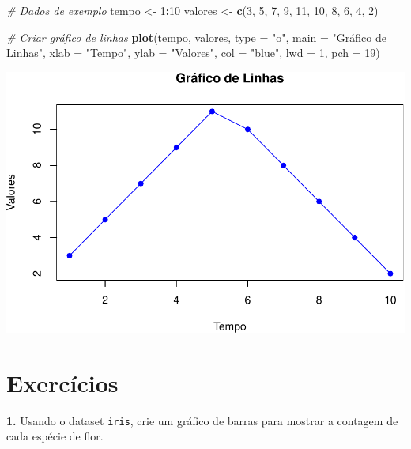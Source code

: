 \documentclass[
]{book}
\newenvironment{Shaded}{\begin{snugshade}}{\end{snugshade}}
\newcommand{\AttributeTok}[1]{\textcolor[rgb]{0.13,0.29,0.53}{#1}}
\newcommand{\CommentTok}[1]{\textcolor[rgb]{0.56,0.35,0.01}{\textit{#1}}}
\newcommand{\DecValTok}[1]{\textcolor[rgb]{0.00,0.00,0.81}{#1}}
\newcommand{\FunctionTok}[1]{\textcolor[rgb]{0.13,0.29,0.53}{\textbf{#1}}}
\newcommand{\NormalTok}[1]{#1}
\newcommand{\OtherTok}[1]{\textcolor[rgb]{0.56,0.35,0.01}{#1}}
\newcommand{\SpecialCharTok}[1]{\textcolor[rgb]{0.81,0.36,0.00}{\textbf{#1}}}
\newcommand{\StringTok}[1]{\textcolor[rgb]{0.31,0.60,0.02}{#1}}
\begin{document}
\begin{Shaded}
\begin{Highlighting}[]
\CommentTok{\# Dados de exemplo}
\NormalTok{tempo }\OtherTok{\textless{}{-}} \DecValTok{1}\SpecialCharTok{:}\DecValTok{10}
\NormalTok{valores }\OtherTok{\textless{}{-}} \FunctionTok{c}\NormalTok{(}\DecValTok{3}\NormalTok{, }\DecValTok{5}\NormalTok{, }\DecValTok{7}\NormalTok{, }\DecValTok{9}\NormalTok{, }\DecValTok{11}\NormalTok{, }\DecValTok{10}\NormalTok{, }\DecValTok{8}\NormalTok{, }\DecValTok{6}\NormalTok{, }\DecValTok{4}\NormalTok{, }\DecValTok{2}\NormalTok{)}

\CommentTok{\# Criar gráfico de linhas}
\FunctionTok{plot}\NormalTok{(tempo, valores, }
     \AttributeTok{type =} \StringTok{"o"}\NormalTok{, }
     \AttributeTok{main =} \StringTok{"Gráfico de Linhas"}\NormalTok{, }
     \AttributeTok{xlab =} \StringTok{"Tempo"}\NormalTok{, }
     \AttributeTok{ylab =} \StringTok{"Valores"}\NormalTok{, }
     \AttributeTok{col =} \StringTok{"blue"}\NormalTok{,}
     \AttributeTok{lwd =} \DecValTok{1}\NormalTok{,}
     \AttributeTok{pch =} \DecValTok{19}\NormalTok{)}
\end{Highlighting}
\end{Shaded}

\includegraphics{introR_files/figure-latex/unnamed-chunk-186-1.pdf}

\section{Exercícios}\label{exercuxedcios-14}

\textbf{1.} Usando o dataset \texttt{iris}, crie um gráfico de barras para mostrar a
contagem de cada espécie de flor.
\end{document}

